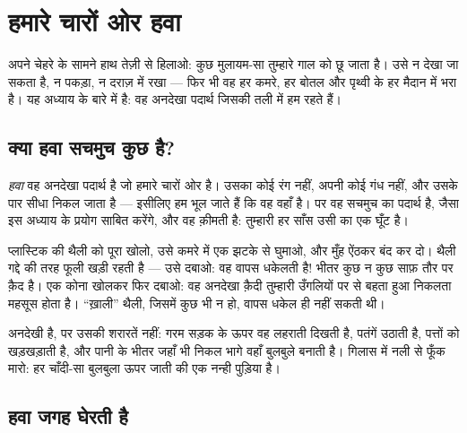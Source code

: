 \chapter{हमारे चारों ओर हवा}\label{ch:g2:air-around-us}

अपने चेहरे के सामने हाथ तेज़ी से हिलाओ: कुछ मुलायम-सा तुम्हारे गाल को
छू जाता है। उसे न देखा जा सकता है, न पकड़ा, न दराज़ में रखा --- फिर
भी वह हर कमरे, हर बोतल और पृथ्वी के हर मैदान में भरा है। यह अध्याय
 के बारे में है: वह अनदेखा पदार्थ जिसकी तली में हम रहते हैं।

\section{क्या हवा सचमुच कुछ है?}

\begin{definition}[हवा]\label{def:g2:air-around-us:air}
\emph{हवा} वह अनदेखा पदार्थ है जो हमारे चारों ओर है। उसका
कोई रंग नहीं, अपनी कोई गंध नहीं, और  उसके पार सीधा निकल
जाता है --- इसीलिए हम भूल जाते हैं कि वह वहाँ है। पर वह सचमुच का
पदार्थ है, जैसा इस अध्याय के प्रयोग साबित करेंगे, और वह क़ीमती है:
तुम्हारी हर साँस उसी का एक घूँट है।
\end{definition}

\begin{example}\label{ex:g2:air-around-us:catch}
प्लास्टिक की थैली को पूरा खोलो, उसे कमरे में एक झटके से घुमाओ, और
मुँह ऐंठकर बंद कर दो। थैली गद्दे की तरह फूली खड़ी रहती है --- उसे
दबाओ: वह वापस धकेलती है! भीतर कुछ न कुछ साफ़ तौर पर क़ैद है। एक कोना
खोलकर फिर दबाओ: वह अनदेखा क़ैदी तुम्हारी उँगलियों पर से बहता हुआ
निकलता महसूस होता है। ``ख़ाली'' थैली, जिसमें कुछ भी न हो, वापस धकेल
ही नहीं सकती थी।
\end{example}

\begin{example}[हवा ख़ुद को कहाँ दिखाती है]\label{ex:g2:air-around-us:shows}
 अनदेखी है, पर उसकी शरारतें नहीं: गरम सड़क के ऊपर वह लहराती दिखती
है, पतंगें उठाती है, पत्तों को खड़खड़ाती है, और पानी के भीतर जहाँ भी
निकल भागे वहाँ बुलबुले बनाती है। गिलास में नली से फूँक मारो: हर
चाँदी-सा बुलबुला ऊपर जाती  की एक नन्ही पुड़िया है।
\end{example}

\section{हवा जगह घेरती है}

